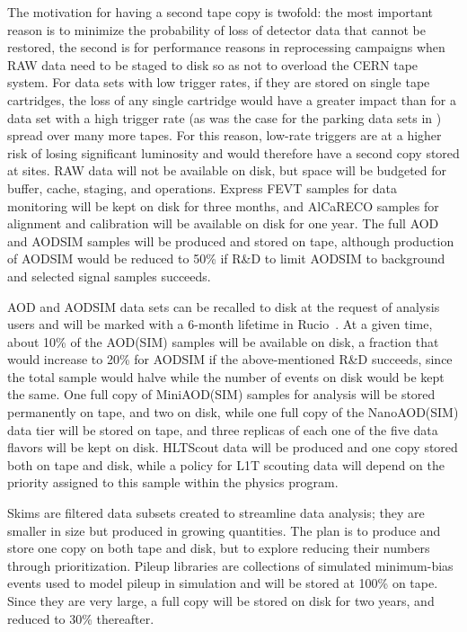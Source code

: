 The motivation for having a second tape copy is twofold: the most important reason is to minimize the probability of loss of detector data that cannot be restored, the second is for performance reasons in reprocessing campaigns when \gls{RAW} data need to be staged to disk so as not to overload the CERN tape system. For data sets with low trigger rates, if they are stored on single tape cartridges, the loss of any single cartridge would have a greater impact than for a data set with a high trigger rate (as was the case for the parking data sets in \RunThree) spread over many more tapes. For this reason, low-rate triggers are at a higher risk of losing significant luminosity and would therefore have a second copy stored at \TierOne sites. \gls{RAW} data will not be available on disk, but space will be budgeted for \TierZero buffer, cache, staging, and operations.
Express FEVT samples for data monitoring will be kept on disk for three months, and AlCaRECO samples for alignment and calibration will be available on disk for one year.
The full \gls{AOD} and AODSIM samples will be produced and stored on tape, although production of AODSIM would be reduced to 50\% if R\&D to limit AODSIM to background and selected signal samples succeeds.

\gls{AOD} and AODSIM data sets can be recalled to disk at the request of analysis users and will be marked with a 6-month lifetime in Rucio~\cite{Barisits2019}. At a given time, about 10\% of the AOD(\gls{SIM}) samples will be available on disk, a fraction that would increase to 20\% for AODSIM if the above-mentioned R\&D succeeds, since the total sample would halve while the number of events on disk would be kept the same.
One full copy of MiniAOD(SIM) samples for analysis will be stored permanently on tape, and two on disk, while one full copy of the NanoAOD(SIM) data tier will be stored on tape, and three replicas of each one of the five data flavors will be kept on disk.
HLTScout data will be produced and one copy stored both on tape and disk, while a policy for \gls{L1T} scouting data will depend on the priority assigned to this sample within the physics program. 

Skims are filtered data subsets created to streamline data analysis; they are smaller in size but produced in growing quantities. The plan is to produce and store one copy on both tape and disk, but to explore reducing their numbers through prioritization. 
Pileup libraries are collections of simulated minimum-bias events used to model pileup in simulation and will be stored at 100\% on tape. Since they are very large, a full copy will be stored on disk for two years, and reduced to 30\% thereafter.

